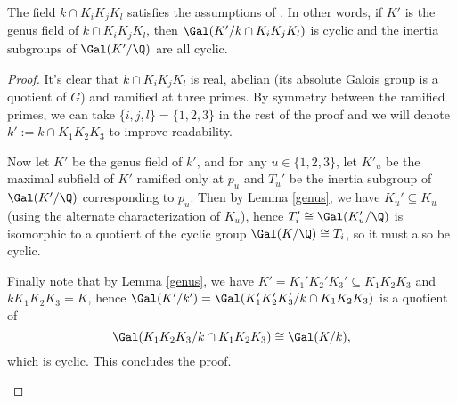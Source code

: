 \begin{lemma}\label{Azar}
The field $k\cap K_iK_jK_l$ satisfies the assumptions of \citep{Kucera2016}. In other words, if $K'$ is the genus field of $k\cap K_iK_jK_l$, then $\Gal(K'/k\cap K_iK_jK_l)$ is cyclic and the inertia subgroups of $\Gal(K'/\Q)$ are all cyclic.
\end{lemma}
\begin{proof}

It's clear that $k\cap K_iK_jK_l$ is real, abelian (its absolute Galois group is a quotient of $G$) and ramified at three primes. By symmetry between the ramified primes, we can take $\{i,j,l\}=\{1,2,3\}$ in the rest of the proof and we will denote $k':=k\cap K_1K_2K_3$ to improve readability.

Now let $K'$ be the genus field of $k'$, and for any $u\in\{1,2,3\}$, let $K'_u$ be the maximal subfield of $K'$ ramified only at $p_u$ and $T_u'$ be the inertia subgroup of $\Gal(K'/\Q)$ corresponding to $p_u$.
Then by Lemma \ref{genus}, we have $K_u'\subseteq K_u$ (using the alternate characterization of $K_u$), hence $T'_i\cong \Gal(K_u'/\Q)$ is isomorphic to a quotient of the cyclic group $\Gal(K/\Q)\cong T_i$, so it must also be cyclic.

Finally note that by Lemma \ref{genus}, we have $K'=K_1'K_2'K_3'\subseteq K_1K_2K_3$ and $kK_1K_2K_3=K$, hence $\Gal(K'/k')=\Gal(K_1'K_2'K_3'/k\cap K_1K_2K_3)$ is a quotient of $$\Gal(K_1K_2K_3/k\cap K_1K_2K_3)\cong \Gal(K/k),$$
which is cyclic. This concludes the proof.

\begin{center}
\end{center}

\end{proof}

